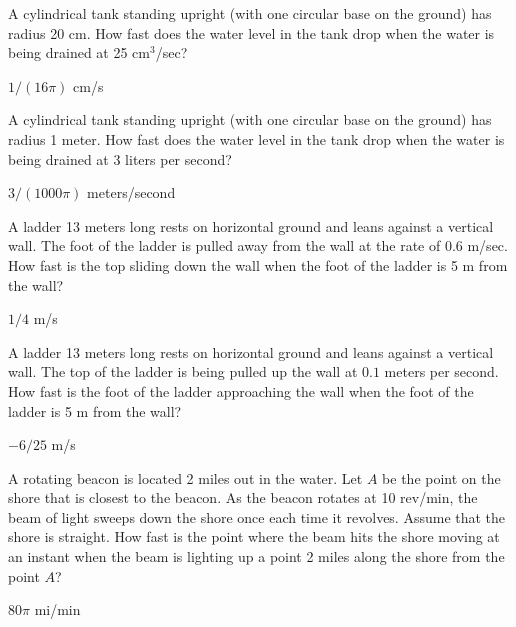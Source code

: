 \begin{exercises}

\begin{exercise}
A cylindrical tank standing upright (with one circular base on the
ground) has radius 20 cm.  How fast does the water level in the
tank drop when the water is being drained at 25 cm${}^3$/sec?
\begin{answer} $1/(16\pi)$ cm/s
\end{answer}\end{exercise}

\begin{exercise}
A cylindrical tank standing upright (with one circular base on the
ground) has radius 1 meter.  How fast does the water level in the
tank drop when the water is being drained at 3 liters per second?
\begin{answer} $3/(1000\pi)$ meters/second
\end{answer}\end{exercise}

\begin{exercise} A ladder 13 meters long rests on horizontal ground and leans
against a vertical wall.  The foot of the ladder is pulled away from
the wall at the rate of 0.6 m/sec.  How fast is the top sliding down
the wall when the foot of the ladder is 5 m from the wall?
\begin{answer} $1/4$ m/s
\end{answer}\end{exercise}

\begin{exercise} A ladder 13 meters long rests on horizontal ground and leans
against a vertical wall. The top of the ladder is being pulled up the
wall at $0.1$ meters per second.
How fast is the foot of the ladder approaching 
the wall when the foot of the ladder is 5 m from the wall?
\begin{answer} $-6/25$ m/s
\end{answer}\end{exercise}

\begin{exercise}
A rotating beacon is located 2 miles out in the water.  Let $A$ be the
point on the shore that is closest to the beacon.  As the beacon rotates at
10 rev/min, the beam of light sweeps down the shore once each time it revolves.
Assume that the shore is straight.  How fast is the point where the beam
hits the shore moving at an instant when the beam is lighting up a point 2
miles along the shore from the point $A$?
\begin{answer} $80\pi$ mi/min
\end{answer}\end{exercise}


\end{exercises}
